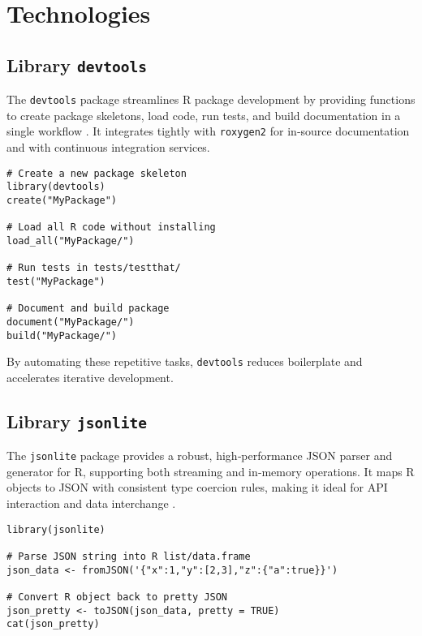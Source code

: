 
\begin{chapterabstract}
\end{chapterabstract}

\section{Technologies}

\subsection{Library \texttt{devtools}}

The \texttt{devtools} package streamlines R package development by providing functions to create package skeletons, load code, run tests, and build documentation in a single workflow \cite{wickham2019devtools}. It integrates tightly with \texttt{roxygen2} for in‐source documentation and with continuous integration services.

\begin{verbatim}
# Create a new package skeleton
library(devtools)
create("MyPackage")

# Load all R code without installing
load_all("MyPackage/")

# Run tests in tests/testthat/
test("MyPackage")

# Document and build package
document("MyPackage/")
build("MyPackage/")
\end{verbatim}

By automating these repetitive tasks, \texttt{devtools} reduces boilerplate and accelerates iterative development.

\subsection{Library \texttt{jsonlite}}

The \texttt{jsonlite} package provides a robust, high‐performance JSON parser and generator for R, supporting both streaming and in‐memory operations. It maps R objects to JSON with consistent type coercion rules, making it ideal for API interaction and data interchange \cite{ooms2014jsonlite}.

\begin{verbatim}
library(jsonlite)

# Parse JSON string into R list/data.frame
json_data <- fromJSON('{"x":1,"y":[2,3],"z":{"a":true}}')

# Convert R object back to pretty JSON
json_pretty <- toJSON(json_data, pretty = TRUE)
cat(json_pretty)
\end{verbatim}

